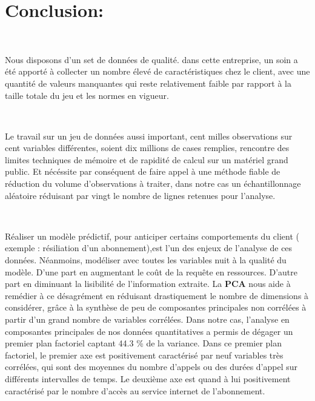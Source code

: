 \documentclass[]{imsart}
\numberwithin{equation}{section}
\theoremstyle{plain}
\begin{document}
\hypertarget{conclusion}{%
\section{Conclusion:}\label{conclusion}}

~

Nous disposons d'un set de données de qualité. dans cette entreprise, un soin a été apporté à collecter un nombre élevé de caractéristiques chez le client, avec une quantité de valeurs manquantes qui reste relativement faible par rapport à la taille totale du jeu et les normes en vigueur.

~

Le travail sur un jeu de données aussi important, cent milles observations sur cent variables différentes, soient dix millions de cases remplies, rencontre des limites techniques de mémoire et de rapidité de calcul sur un matériel grand public. Et nécéssite par conséquent de faire appel à une méthode fiable de réduction du volume d'observations à traiter, dans notre cas un échantillonnage aléatoire réduisant par vingt le nombre de lignes retenues pour l'analyse.

~

Réaliser un modèle prédictif, pour anticiper certains comportements du client ( exemple : résiliation d'un abonnement),est l'un des enjeux de l'analyse de ces données. Néanmoins, modéliser avec toutes les variables nuit à la qualité du modèle. D'une part en augmentant le coût de la requête en ressources. D'autre part en diminuant la lisibilité de l'information extraite. La \textbf{PCA} nous aide à remédier à ce désagrément en réduisant drastiquement le nombre de dimensions à considérer, grâce à la synthèse de peu de composantes principales non corrélées à partir d'un grand nombre de variables corrélées. Dans notre cas, l'analyse en composantes principales de nos données quantitatives a permis de dégager un premier plan factoriel captant 44.3 \% de la variance. Dans ce premier plan factoriel, le premier axe est positivement caractérisé par neuf variables très corrélées, qui sont des moyennes du nombre d'appels ou des durées d'appel sur différents intervalles de temps. Le deuxième axe est quand à lui positivement caractérisé par le nombre d'accès au service internet de l'abonnement.

~
\end{document}
